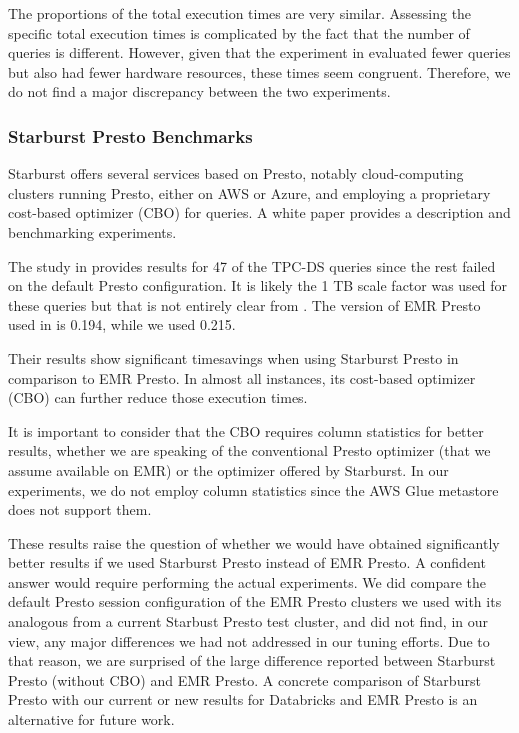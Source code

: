 The proportions of the total execution times are very similar. Assessing the specific total execution times is complicated by the fact that the number of queries is different. However, given that the experiment in \cite{databricksReport} evaluated fewer queries but also had fewer hardware resources, these times seem congruent. Therefore, we do not find a major discrepancy between the two experiments.

\subsubsection{Starburst Presto Benchmarks}

Starburst offers several services based on Presto, notably cloud-computing clusters running Presto, either on AWS or Azure, and employing a proprietary cost-based optimizer (CBO) for queries. A white paper \cite{starburstReport} provides a description and benchmarking experiments.

The study in \cite{starburstReport} provides results for 47 of the TPC-DS queries since the rest failed on the default Presto configuration. It is likely the 1 TB scale factor was used for these queries but that is not entirely clear from \cite{starburstReport}. The version of EMR Presto used in \cite{starburstReport} is 0.194, while we used 0.215.

Their results show significant timesavings when using Starburst Presto in comparison to EMR Presto. In almost all instances, its cost-based optimizer (CBO) can further reduce those execution times.

It is important to consider that the CBO requires column statistics for better results, whether we are speaking of the conventional Presto optimizer (that we assume available on EMR) or the optimizer offered by Starburst. In our experiments, we do not employ column statistics since the AWS Glue metastore does not support them.

These results raise the question of whether we would have obtained significantly better results if we used Starburst Presto instead of EMR Presto. A confident answer would require performing the actual experiments. We did compare the default Presto session configuration of the EMR Presto clusters we used with its analogous from a current Starbust Presto test cluster, and did not find, in our view, any major differences we had not addressed in our tuning efforts. Due to that reason, we are surprised of the large difference reported between Starburst Presto (without CBO) and EMR Presto. A concrete comparison of Starburst Presto with our current or new results for Databricks and EMR Presto is an alternative for future work.











